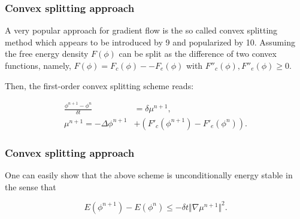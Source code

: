 \documentclass{beamer}
\begin{document}
    \begin{frame}
    \frametitle{Convex splitting approach}

A very popular approach for gradient flow is the so called convex splitting method which appears to be introduced by 9 and popularized by 10. Assuming the free energy density $F(\phi)$ can be split as the difference of two convex functions, namely, $F(\phi)=F_c(\phi)-−F_e(\phi)$ with $F''_c(\phi), F''_e(\phi)\geq 0.$

 Then, the first-order convex splitting scheme reads:

\begin{equation}\label{Convex}
  \begin{split}
     \frac{\phi^{n+1}-\phi^n}{\delta t}&=\delta \mu^{n+1},\\
     \mu^{n+1} = -\Delta\phi^{n+1}&+(F'_c(\phi^{n+1})-F'_e(\phi^n)).
  \end{split}
\end{equation}

    \end{frame}
    \begin{frame}
    \frametitle{Convex splitting approach}
One can easily show that the above scheme is unconditionally energy stable in the sense that

$$
E(\phi^{n+1})-E(\phi^n)\leq -\delta t \Vert\nabla\mu^{n+1}\Vert^2.
$$



    \end{frame}
\end{document}
